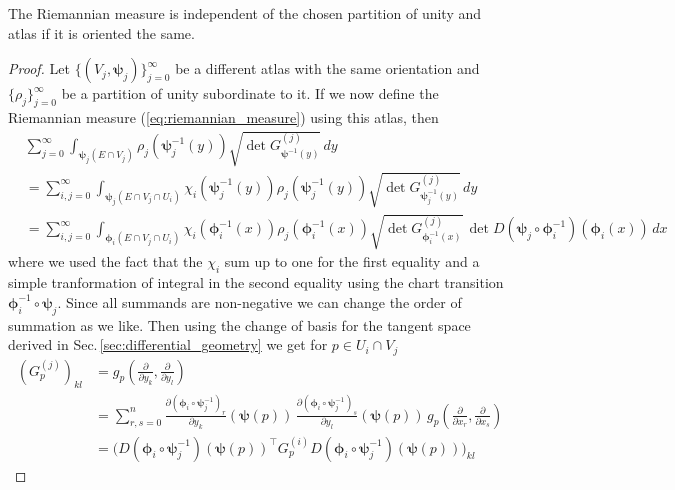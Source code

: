 \documentclass[../master_thesis.tex]{subfiles}
\begin{document}
\begin{proposition}
    The Riemannian measure is independent of the chosen partition of unity and atlas if it is 
    oriented the same.
\end{proposition}
\begin{proof}
    Let $\{(V_j, \boldsymbol{\psi}_j)\}_{j=0}^\infty$ 
    be a different atlas with the same orientation and 
    $\{\rho_j\}_{j=0}^\infty$ be a partition of unity subordinate to it. If we now 
    define the Riemannian measure (\ref{eq:riemannian_measure}) using this atlas, then
    \begin{align}
        &\sum_{j=0}^\infty \int_{\boldsymbol{\psi}_j(E\cap V_j)} \rho_j(\boldsymbol{\psi}_j^{-1}(y))
            \sqrt{\det G^{(j)}_{\boldsymbol{\psi}^{-1}(y)}} \, dy \nonumber
        \\ &= \sum_{i,j=0}^\infty \int_{\boldsymbol{\psi}_j(E\cap V_j \cap U_i)} \chi_i(\boldsymbol{\psi}_j^{-1}(y)) \rho_j(\boldsymbol{\psi}_j^{-1}(y))
            \sqrt{\det G^{(j)}_{\boldsymbol{\psi}_j^{-1}(y)}} \, dy \nonumber
        \\ &= \sum_{i,j=0}^\infty \int_{\boldsymbol{\phi}_i(E\cap V_j \cap U_i)} \chi_i(\boldsymbol{\phi}_i^{-1}(x)) \rho_j(\boldsymbol{\phi}_i^{-1}(x))
            \sqrt{\det G^{(j)}_{\boldsymbol{\phi}_i^{-1}(x)}} \, \det D(\boldsymbol{\psi}_j \circ \boldsymbol{\phi}^{-1}_i)(\boldsymbol{\phi}_i(x)) \, dx \label{eq:double_sum_riemannian_measure}
    \end{align}
    where we used the fact that the $\chi_i$ sum up to one for the first 
    equality and a simple tranformation of integral in the second equality
    using the chart transition $\boldsymbol{\phi}_i^{-1}\circ \boldsymbol{\psi}_j$. Since all summands 
    are non-negative we can change the order of summation as we like. Then using the 
    change of basis for the tangent space derived in Sec.\,\ref{sec:differential_geometry}
    we get for $p \in U_i \cap V_j$
    \begin{align*}
        (G^{(j)}_p)_{kl} &= g_p(\frac{\partial}{\partial y_k}, \frac{\partial}{\partial y_l})
        \\ &= \sum_{r,s=0}^n \frac{\partial(\boldsymbol{\phi}_i \circ \boldsymbol{\psi}_j^{-1})_r}{\partial y_k}(\boldsymbol{\psi}(p))
            \, \frac{\partial(\boldsymbol{\phi}_i \circ \boldsymbol{\psi}_j^{-1})_s}{\partial y_l}(\boldsymbol{\psi}(p))
            \, g_p(\frac{\partial}{\partial x_r}, \frac{\partial}{\partial x_s})
        \\ &= \bigg( D(\boldsymbol{\phi}_i \circ \boldsymbol{\psi}_j^{-1})(\boldsymbol{\psi}(p))^\top G^{(i)}_p D(\boldsymbol{\phi}_i \circ \boldsymbol{\psi}_j^{-1})(\boldsymbol{\psi}(p))\bigg)_{kl}

\end{align*}
\end{proof}
\end{document}
